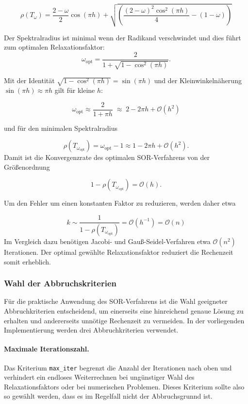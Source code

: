 \documentclass[11pt,a4paper]{article}
\begin{document}
\[
\rho(T_\omega) = \frac{2-\omega}{2} \cos{(\pi h)} + \sqrt{\left( \frac{(2-\omega)^2 \cos^2(\pi h)}{4} - (1-\omega) \right)} 
\]

Der Spektralradius ist minimal wenn der Radikand verschwindet und dies führt zum optimalen Relaxationsfaktor:
\[\omega_{\text{opt}} 
= \frac{2}{1+\sqrt{1-\cos^2(\pi h)}}.\]

Mit der Identität
\(\sqrt{1-\cos^2(\pi h)} = \sin(\pi h) \) und der Kleinwinkelnäherung \( \sin(\pi h) \approx \pi h\) gilt für kleine \(h\):

\[
\boxed{\;
\omega_{\text{opt}} \approx \frac{2}{1+\pi h}
\;\approx\; 2 - 2\pi h + \mathcal{O}(h^2)
\;}
\]

und für den minimalen Spektralradius

\[
\rho(T_{\omega_{\text{opt}}})
= \omega_{\text{opt}} - 1
\approx 1 - 2\pi h + \mathcal{O}(h^2).
\]
Damit ist die Konvergenzrate des optimalen SOR-Verfahrens von der Größenordnung

\[
1 - \rho(T_{\omega_{\text{opt}}}) = \mathcal{O}(h).
\]

Um den Fehler um einen konstanten Faktor zu reduzieren, werden daher etwa

\[
\boxed{k \sim \frac{1}{1-\rho(T_{\omega_{\text{opt}}})} = \mathcal{O}(h^{-1}) = \mathcal{O}(n)}
\]
Im Vergleich dazu benötigen Jacobi- und Gauß-Seidel-Verfahren etwa \(\mathcal{O}(n^2)\) Iterationen. Der optimal gewählte Relaxationsfaktor reduziert die Rechenzeit somit erheblich.


\subsubsection{Wahl der Abbruchskriterien}

Für die praktische Anwendung des SOR-Verfahrens ist die Wahl geeigneter Abbruchkriterien entscheidend, um einerseits eine hinreichend genaue Lösung zu erhalten und andererseits unnötige Rechenzeit zu vermeiden. In der vorliegenden Implementierung werden drei Abbruchkriterien verwendet.

\paragraph{Maximale Iterationszahl.}
Das Kriterium \texttt{max\_iter} begrenzt die Anzahl der Iterationen nach oben und verhindert ein endloses Weiterrechnen bei ungünstiger Wahl des Relaxationsfaktors oder bei numerischen Problemen. Dieses Kriterium sollte also so gewählt werden, dass es im Regelfall nicht der Abbruchsgrunnd ist.
\end{document}
